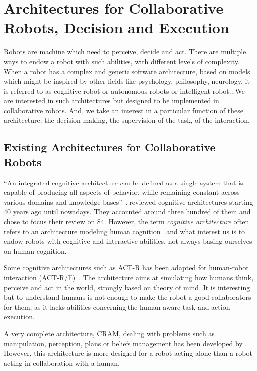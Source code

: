 \documentclass[a4paper,11pt,twoside]{StyleThese}
\begin{document}
	\setcounter{chapter}{2} %
	\dominitoc
	\faketableofcontents
	\fi

\chapter{Architectures for Collaborative Robots, Decision and Execution}\label{chapter:chap3}
\minitoc
Robots are machine which need to perceive, decide and act. There are multiple ways to endow a robot with such abilities, with different levels of complexity. When a robot has a complex and generic software architecture, based on models which might be inspired by other fields like psychology, philosophy, neurology, it is referred to as cognitive robot or autonomous robots or intelligent robot...We are interested in such architectures but designed to be implemented in collaborative robots. And, we take an interest in a particular function of these architecture: the decision-making, the supervision of the task, of the interaction.

\section{Existing Architectures for Collaborative Robots}\label{chap3:sec:archi}
``An integrated cognitive architecture can be defined as a single system that is capable of producing all aspects of behavior, while remaining constant across various domains and knowledge bases''~\citep[p.~104]{chong_2007_integrated}. \cite{kotseruba_2020_40} reviewed cognitive architectures starting 40 years ago until nowadays. They accounted around three hundred of them and chose to focus their review on 84. However, the term \emph{cognitive architecture} often refers to an architecture modeling human cognition~\citep{howes_1997_role} and what interest us is to endow robots with cognitive and interactive abilities, not always basing ourselves on human cognition.  

Some cognitive architectures such as ACT-R has been adapted for human-robot interaction (ACT-R/E)~\citep{trafton_2013_act}. The architecture aims at simulating how humans think, perceive and act in the world, strongly based on theory of mind. It is interesting but to understand humans is not enough to make the robot a good collaborators for them, as it lacks abilities concerning the human-aware task and action execution. 

A very complete architecture, CRAM, dealing with problems such as manipulation, perception, plans or beliefs management has been developed by \cite{beetz_2010_cram}. However, this architecture is more designed for a robot acting alone than a robot acting in collaboration with a human.
\end{document}
